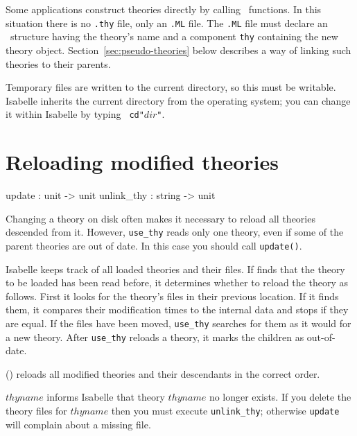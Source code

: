 Some applications construct theories directly by calling \ML\ functions.  In
this situation there is no {\tt.thy} file, only an {\tt.ML} file.  The
{\tt.ML} file must declare an \ML\ structure having the theory's name and a
component {\tt thy} containing the new theory object.
Section~\ref{sec:pseudo-theories} below describes a way of linking such
theories to their parents.

\begin{warn}
  Temporary files are written to the current directory, so this must be
  writable.  Isabelle inherits the current directory from the operating
  system; you can change it within Isabelle by typing {\tt
  cd"$dir$"}.
\end{warn}


\section{Reloading modified theories}\label{sec:reloading-theories}
\begin{ttbox}
update     : unit -> unit
unlink_thy : string -> unit
\end{ttbox}
Changing a theory on disk often makes it necessary to reload all theories
descended from it.  However, {\tt use_thy} reads only one theory, even if
some of the parent theories are out of date.  In this case you should call
{\tt update()}.

Isabelle keeps track of all loaded theories and their files.  If
 finds that the theory to be loaded has been read before,
it determines whether to reload the theory as follows.  First it looks for
the theory's files in their previous location.  If it finds them, it
compares their modification times to the internal data and stops if they
are equal.  If the files have been moved, {\tt use_thy} searches for them
as it would for a new theory.  After {\tt use_thy} reloads a theory, it
marks the children as out-of-date.

\begin{ttdescription}
\item[\ttindexbold{update}()]
  reloads all modified theories and their descendants in the correct order.

\item[\ttindexbold{unlink_thy} $thyname$]
  informs Isabelle that theory $thyname$ no longer exists.  If you delete the
  theory files for $thyname$ then you must execute {\tt unlink_thy};
  otherwise {\tt update} will complain about a missing file.
\end{ttdescription}


